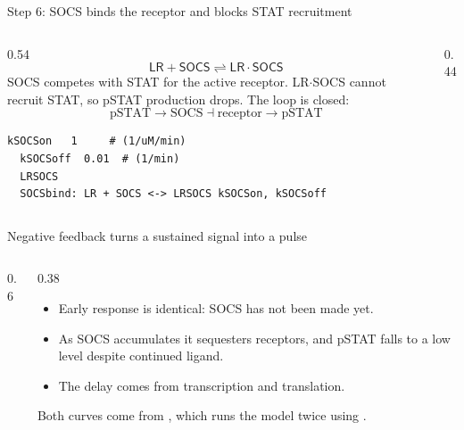 \documentclass[aspectratio=169,10pt,t]{beamer}
\begin{document}
\begin{frame}[fragile]{Step 6: SOCS binds the receptor and blocks STAT recruitment}
  \begin{columns}[c]
    \begin{column}{0.54\textwidth}
      \[
        \mathsf{LR} + \mathsf{SOCS} \rightleftharpoons \mathsf{LR{\cdot}SOCS}
      \]
      SOCS competes with STAT for the active receptor. LR$\cdot$SOCS cannot recruit STAT,
      so pSTAT production drops.
      The loop is closed:
      \[
        \text{pSTAT} \to \text{SOCS} \dashv \text{receptor} \to \text{pSTAT}
      \]
\begin{lstlisting}[language=bngl]
  kSOCSon   1     # (1/uM/min)
  kSOCSoff  0.01  # (1/min)
  LRSOCS
  SOCSbind: LR + SOCS <-> LRSOCS kSOCSon, kSOCSoff
\end{lstlisting}
    \end{column}
    \begin{column}{0.44\textwidth}
      \centering
    \end{column}
  \end{columns}
\end{frame}

\begin{frame}{Negative feedback turns a sustained signal into a pulse}
  \begin{columns}[c]
    \begin{column}{0.6\textwidth}
    \end{column}
    \begin{column}{0.38\textwidth}
      \small
      \begin{itemize}
        \setlength\itemsep{1.5mm}
        \item<3-> Early response is identical: SOCS has not been made yet.
        \item<4-> As SOCS accumulates it sequesters receptors, and pSTAT falls to a low
              level despite continued ligand.
        \item<5-> The delay comes from transcription and translation.
      \end{itemize}
      \vskip2mm
      {\scriptsize Both curves come from , which runs
      the model twice using .}
    \end{column}
  \end{columns}
\end{frame}
\end{document}
